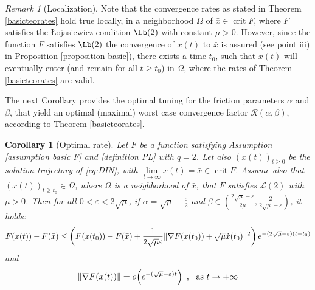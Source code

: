 \documentclass[reqno]{amsart}
\theoremstyle{plain}
\newtheorem{corollary}{Corollary}	%
\theoremstyle{definition}
\theoremstyle{remark}
\newtheorem{remark}{Remark}	%
\DeclareMathOperator{\crit}{crit}	%
\DeclarePairedDelimiter{\norm}{\lVert}{\rVert}	%
\newcommand{\petito}[1]{o\mathopen{}\left(#1\right)}
\newcommand{\Rb}{\mathcal{R}}
\newcommand{\VM}[1]{}
\newcommand{\PM}[1]{}
\begin{document}
\begin{remark}[Localization]
	Note that the convergence rates as stated in Theorem \ref{basicteorates} hold true locally, in a neighborhood $\Omega$ of $\bar{x}\in \crit{F}$, where $F$ satisfies the \L ojasiewicz condition $\Lb(2)$ with constant $\mu>0$. However, since the function $F$ satisfies $\Lb(2)$ the convergence of $x(t)$ to $\bar{x}$ is assured (see point iii) in Proposition \ref{proposition basic}), there exists a time $t_{0}$, such that $x(t)$ will eventually enter (and remain for all $t\geq t_{0}$) in $\Omega$, where the rates of Theorem \ref{basicteorates} are valid. 
\end{remark}
\VM{I would say this seems more like a comment to clear things up. Possibly a footnote, if allowed? Sth along the lines of "F satisfies $\Lb(2)$, so convergence of $x(t)$ to $\bar{x}$ is assured by Proposition \ref{proposition basic}. Trajectory $x(t)$ enters and remains in a neighborhood $\Omega$ of $\bar{x}\in \crit{F}$, where theorem's rates are valid."}

The next Corollary provides the optimal tuning for the friction parameters $\alpha$ and $\beta$, that yield an optimal (maximal) worst case convergence factor $\Rb(\alpha,\beta)$, according to Theorem \ref{basicteorates}.
\PM{TODO: Check if can be streamlined.}
\begin{corollary}[Optimal rate]\label{cor optimal rates}
	Let $F$ be a function satisfying Assumption \ref{assumption basic F} and \ref{definition PL} with $q=2$. Let also $\left(x(t)\right)_{t\geq 0}$ be the solution-trajectory of \eqref{eq:DIN}, with $\lim\limits_{t\to\infty}x(t)=\bar{x}\in \crit{F}$.
Assume also that $\left(x(t)\right)_{t\geq t_{0}} \in \Omega$, where $\Omega$ is a neighborhood of $\bar{x}$, that $F$ satisfies \hyperref[PL]{$\mathcal{L}(2)$} with $\mu>0$. Then for all $0<\varepsilon<2\sqrt{\mu}$, if  $\alpha=\sqrt{\mu}-\frac{\varepsilon}{2}$ and $\beta\in \left(\frac{2\sqrt{\mu}-\varepsilon}{2\mu}, \frac{2}{2\sqrt{\mu}-\varepsilon}\right)$, it holds:
	\begin{equation}\label{rate optimal 2sqrtm}
		F(x(t))-F(\bar{x}) \leq \left(F(x(t_{0}))-F(\bar{x})+ \frac{1}{2\sqrt{\mu}\varepsilon}\norm{\nabla F(x(t_{0}))+\sqrt{\mu}\dot{x}(t_{0})}^2\right)e^{-(2\sqrt{\mu}-\varepsilon)(t-t_{0})}
	\end{equation}
	and 
	\begin{equation}
		\norm{\nabla F(x(t))} = \petito{e^{-(\sqrt{\mu}-\varepsilon)t}} ~ , ~ \text{ as } t\to+\infty
	\end{equation}
\end{corollary}
\end{document}
